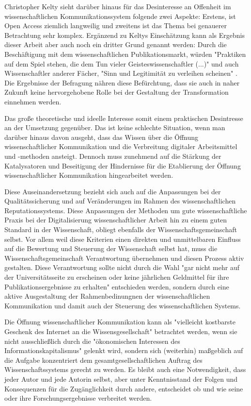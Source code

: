 Christopher Kelty sieht darüber hinaus für das Desinteresse an Offenheit im wissenschaftlichen Kommunikationssystem folgende zwei Aspekte: Erstens, ist Open Access ziemlich langweilig und zweitens ist das Thema bei genauerer Betrachtung sehr komplex. Ergänzend zu Keltys Einschätzung kann als Ergebnis dieser Arbeit aber auch noch ein dritter Grund genannt werden: Durch die Beschäftigung mit dem wissenschaftlichen Publikationsmarkt, würden "Praktiken auf dem Spiel stehen, die dem Tun vieler Geisteswissenschaftler (...)" und auch Wissenschaftler anderer Fächer, "Sinn und Legitimität zu verleihen scheinen" \cite{Hirschi_2015_buch_oa}. Die Ergebnisse der Befragung nähren diese Befürchtung, dass sie auch in naher Zukunft keine hervorgehobene Rolle bei der Gestaltung der Transformation einnehmen werden.

Das große theoretische und ideelle Interesse somit einem praktischen Desintresse an der Umsetzung gegenüber. Das ist keine schlechte Situation, wenn man darüber hinaus davon ausgeht, dass das Wissen über die Öffnung wissenschaftlicher Kommunikation und die Verbreitung digitaler Arbeitsmittel und -methoden ansteigt. Dennoch muss zunehmend auf die Stärkung der Katalysatoren und Beseitigung der Hindernisse für die Etablierung der Öffnung wissenschaftlicher Kommunikation hingearbeitet werden.

Diese Auseinandersetzung bezieht sich auch auf die Anpassungen bei der Qualitätssicherung und auf Veränderungen im Rahmen des wissenschaftlichen Reputationssystems. Diese Anpassungen der Methoden um gute wissenschaftliche Praxis bei der Digitalisierung wissenschaftlicher Arbeit hin zu einem guten Standard in der Wissenschaft, obliegt ebenfalls der Wissenschaftsgemeinschaft selbst. Vor allem weil diese Kriterien einen direkten und unmittelbaren Einfluss auf die Bewertung und Steuerung der Wissenschaft selbst hat, muss die Wissenschaftsgemeinschaft Verantwortung übernehmen und diesen Prozess aktiv gestalten. Diese Verantwortung sollte nicht durch die Wahl "gar nicht mehr auf der Universitätsseite zu erscheinen oder keine jährlichen Geldmittel für ihre Publikationsergebnisse zu erhalten" \cite{Warnke_2012} entschieden werden, sondern durch eine aktive Ausgestaltung der Rahmenbedinungnen der wissenschaftlichen Kommunikation und damit auch der Steuerung des wissenschaftlichen Systems.

Die Öffnung wissenschaftlicher Kommunikation kann als "vielleicht kostbarste Geschenk des Internet an die Wissensgesellschaft" betrachtet werden, wenn sie nicht ausschließlich durch die "ökonomischen Interessen des Informationskapitalismus" \cite{hagner_2015_sache_buches} gelenkt wird, sondern sich (weiterhin) maßgeblich auf die Aufgabe konzentriert dem gesamtgesellschaftlichen Auftrag des Wissenschaftssystems gerecht zu werden. Es bleibt auch eine Notwendigkeit, dass jeder Autor und jede Autorin selbst, aber unter Kenntnisstand der Folgen und Konsequenzen für die Zugänglichkeit durch andere, entscheidet ob und wie seine oder ihre Forschungsergebnisse verbreitet werden.

